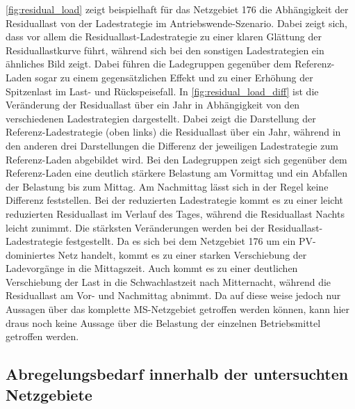 

\autoref{fig:residual_load} zeigt beispielhaft für das Netzgebiet \num{176} die Abhängigkeit der Residuallast von der Ladestrategie im Antriebswende-Szenario.
Dabei zeigt sich, dass vor allem die Residuallast-Ladestrategie zu einer klaren Glättung der Residuallastkurve führt, während sich bei den sonstigen Ladestrategien ein ähnliches Bild zeigt.
Dabei führen die Ladegruppen gegenüber dem Referenz-Laden sogar zu einem gegensätzlichen Effekt und zu einer Erhöhung der Spitzenlast im Last- und Rückspeisefall.
In \autoref{fig:residual_load_diff} ist die Veränderung der Residuallast über ein Jahr in Abhängigkeit von den verschiedenen Ladestrategien dargestellt.
Dabei zeigt die Darstellung der Referenz-Ladestrategie (oben links) die Residuallast über ein Jahr, während in den anderen drei Darstellungen die Differenz der jeweiligen Ladestrategie zum Referenz-Laden abgebildet wird.
Bei den Ladegruppen zeigt sich gegenüber dem Referenz-Laden eine deutlich stärkere Belastung am Vormittag und ein Abfallen der Belastung bis zum Mittag.
Am Nachmittag lässt sich in der Regel keine Differenz feststellen.
Bei der reduzierten Ladestrategie kommt es zu einer leicht reduzierten Residuallast im Verlauf des Tages, während die Residuallast Nachts leicht zunimmt.
Die stärksten Veränderungen werden bei der Residuallast-Ladestrategie festgestellt.
Da es sich bei dem Netzgebiet \num{176} um ein \gls{PV}-dominiertes Netz handelt, kommt es zu einer starken Verschiebung der Ladevorgänge in die Mittagszeit.
Auch kommt es zu einer deutlichen Verschiebung der Last in die Schwachlastzeit nach Mitternacht, während die Residuallast am Vor- und Nachmittag abnimmt.
Da auf diese weise jedoch nur Aussagen über das komplette \gls{MS}-Netzgebiet getroffen werden können, kann hier draus noch keine Aussage über die Belastung der einzelnen Betriebsmittel getroffen werden.





\subsection{Abregelungsbedarf innerhalb der untersuchten Netzgebiete}

